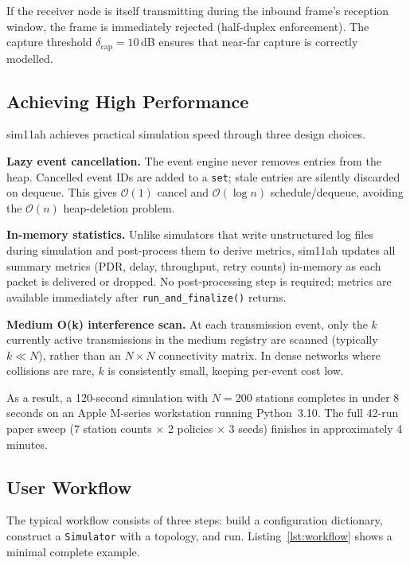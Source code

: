 \documentclass[conference]{IEEEtran}
\begin{document}
If the receiver node is itself transmitting during the inbound frame's
reception window, the frame is immediately rejected (half-duplex enforcement).
The capture threshold $\delta_\mathrm{cap}{=}10$\,dB ensures that
near-far capture is correctly modelled.

\subsection{Achieving High Performance}

sim11ah achieves practical simulation speed through three design choices.

\textbf{Lazy event cancellation.}
The event engine never removes entries from the heap.
Cancelled event IDs are added to a \texttt{set}; stale entries are silently
discarded on dequeue.
This gives $\mathcal{O}(1)$ cancel and $\mathcal{O}(\log n)$
schedule/dequeue, avoiding the $\mathcal{O}(n)$ heap-deletion problem.

\textbf{In-memory statistics.}
Unlike simulators that write unstructured log files during simulation and
post-process them to derive metrics, sim11ah updates all summary metrics
(PDR, delay, throughput, retry counts) in-memory as each packet is delivered
or dropped.
No post-processing step is required; metrics are available immediately after
\texttt{run\_and\_finalize()} returns.

\textbf{Medium O(k) interference scan.}
At each transmission event, only the $k$ currently active transmissions in
the medium registry are scanned (typically $k \ll N$), rather than an
$N{\times}N$ connectivity matrix.
In dense networks where collisions are rare, $k$ is consistently small,
keeping per-event cost low.

As a result, a 120-second simulation with $N{=}200$ stations completes in
under 8\,seconds on an Apple M-series workstation running Python~3.10.
The full 42-run paper sweep (7 station counts $\times$ 2 policies $\times$
3 seeds) finishes in approximately 4\,minutes.

\subsection{User Workflow}

The typical workflow consists of three steps: build a configuration
dictionary, construct a \texttt{Simulator} with a topology, and run.
Listing~\ref{lst:workflow} shows a minimal complete example.
\end{document}
